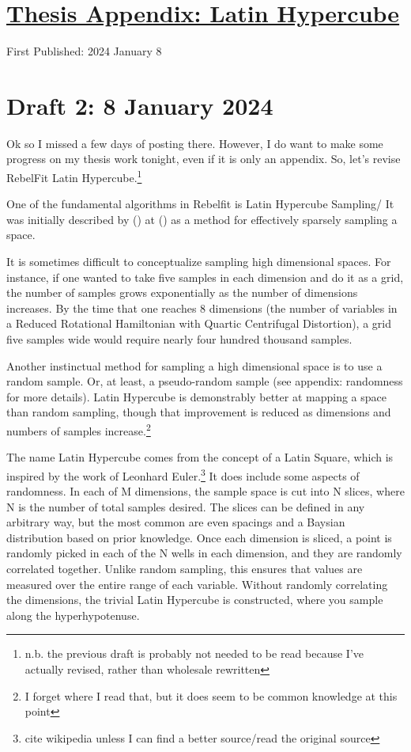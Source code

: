 \documentclass[12pt]{article}[titlepage]
\renewcommand{\,}{\textsuperscript{,}}
\begin{document}
\doublespacing
\section{\href{thesis-latin-hypercube.html}{Thesis Appendix: Latin Hypercube}}
First Published: 2024 January 8
\section{Draft 2: 8 January 2024}
Ok so I missed a few days of posting there.
However, I do want to make some progress on my thesis work tonight, even if it is only an appendix.
So, let's revise RebelFit Latin Hypercube.\footnote{n.b. the previous draft is probably not needed to be read because I've actually revised, rather than wholesale rewritten}

One of the fundamental algorithms in Rebelfit is Latin Hypercube Sampling/
It was initially described by () at () as a method for effectively sparsely sampling a space.

It is sometimes difficult to conceptualize sampling high dimensional spaces.
For instance, if one wanted to take five samples in each dimension and do it as a grid, the number of samples grows exponentially as the number of dimensions increases.
By the time that one reaches 8 dimensions (the number of variables in a Reduced Rotational Hamiltonian with Quartic Centrifugal Distortion), a grid five samples wide would require nearly four hundred thousand samples.

Another instinctual method for sampling a high dimensional space is to use a random sample.
Or, at least, a pseudo-random sample (see appendix: randomness for more details).
Latin Hypercube is demonstrably better at mapping a space than random sampling, though that improvement is reduced as dimensions and numbers of samples increase.\footnote{I forget where I read that, but it does seem to be common knowledge at this point}

The name Latin Hypercube comes from the concept of a Latin Square, which is inspired by the work of Leonhard Euler.\footnote{cite wikipedia unless I can find a better source/read the original source}
It does include some aspects of randomness.
In each of M dimensions, the sample space is cut into N slices, where N is the number of total samples desired.
The slices can be defined in any arbitrary way, but the most common are even spacings and a Baysian distribution based on prior knowledge.
Once each dimension is sliced, a point is randomly picked in each of the N wells in each dimension, and they are randomly correlated together.
Unlike random sampling, this ensures that values are measured over the entire range of each variable.
Without randomly correlating the dimensions, the trivial Latin Hypercube is constructed, where you sample along the hyperhypotenuse.
\end{document}
